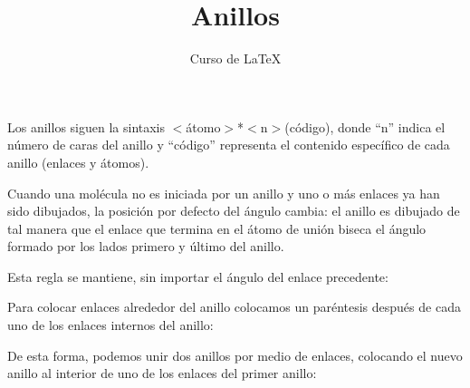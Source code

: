 \documentclass[12pt,letterpaper]{article}
\author{Curso de \LaTeX}
\title{Anillos}
\begin{document}
\maketitle

Los anillos siguen la sintaxis $ < $átomo$ > $*$ < $n$ > $(código), donde ``n'' indica el número de caras del anillo y ``código'' representa el contenido específico de cada anillo (enlaces y átomos).

\begin{center}



\end{center}

Cuando una molécula no es iniciada por un anillo y uno o más enlaces ya han sido dibujados, la posición por defecto del ángulo cambia: el anillo es dibujado de tal manera que el enlace que termina en el átomo de unión biseca el ángulo formado por los lados primero y último del anillo.

\begin{center}
\end{center}

Esta regla se mantiene, sin importar el ángulo del enlace precedente:

\begin{center}
\vskip5pt
\end{center}

Para colocar enlaces alrededor del anillo colocamos un paréntesis después de cada uno de los enlaces internos del anillo:

\begin{center}
\end{center}

De esta forma, podemos unir dos anillos por medio de enlaces, colocando el nuevo anillo al interior de uno de los enlaces del primer anillo:

\end{document}
